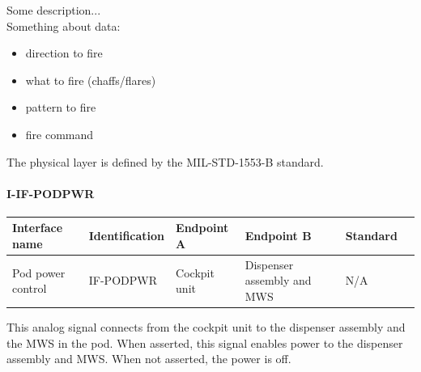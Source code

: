 Some description...\\
Something about data:
\begin{itemize}
\item direction to fire
\item what to fire (chaffs/flares)
\item pattern to fire
\item fire command
\end{itemize}

The physical layer is defined by the MIL-STD-1553-B standard.

\paragraph{I-IF-PODPWR}

\begin{center}
\begin{tabular}{ | p{2cm} | l | p{2.3cm} | p{2.3cm} | l | p{1cm} |}
\hline
 \textbf{Interface name} & \textbf{Identification} & \textbf{Endpoint A} & \textbf{Endpoint B} & \textbf{Standard}\\ \hline

 Pod power control & IF-PODPWR & Cockpit unit & Dispenser assembly and MWS & N/A\\ \hline
 
\end{tabular}
\end{center}

This analog signal connects from the cockpit unit to the dispenser assembly and the MWS in the pod. When asserted, this signal enables power to the dispenser assembly and MWS. When not asserted, the power is off.